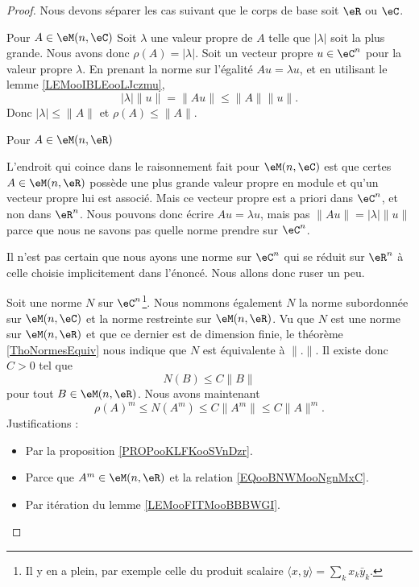 \begin{proof}
    Nous devons séparer les cas suivant que le corps de base soit \( \eR\) ou \( \eC\).

    \begin{subproof}
        \item[Pour \( A\in \eM(n,\eC)\)]
            Soit \( \lambda\) une valeur propre de \( A\) telle que \( | \lambda |\) soit la plus grande. Nous avons donc \( \rho(A)=| \lambda |\). Soit un vecteur propre \( u\in \eC^n\) pour la valeur propre \( \lambda\). En prenant la norme sur l'égalité \( Au=\lambda u\), et en utilisant le lemme \ref{LEMooIBLEooLJczmu},
            \begin{equation}
                | \lambda |\| u \|=\| Au \|\leq \| A \|\| u \|.
            \end{equation}
            Donc \( | \lambda |\leq \| A \|\) et \( \rho(A)\leq\| A \|\).

        \item[Pour \( A\in \eM(n,\eR)\)]

            L'endroit qui coince dans le raisonnement fait pour \( \eM(n,\eC)\) est que certes \( A\in \eM(n,\eR)\) possède une plus grande valeur propre en module et qu'un vecteur propre lui est associé. Mais ce vecteur propre est a priori dans \( \eC^n\), et non dans \( \eR^n\). Nous pouvons donc écrire \( Au=\lambda u\), mais pas \( \| Au \|=| \lambda |\| u \|\) parce que nous ne savons pas quelle norme prendre sur \( \eC^n\).

            Il n'est pas certain que nous ayons une norme sur \( \eC^n\) qui se réduit sur \( \eR^n\) à celle choisie implicitement dans l'énoncé. Nous allons donc ruser un peu.

            Soit une norme \( N\) sur \( \eC^n\)\footnote{Il y en a plein, par exemple celle du produit scalaire \( \langle x, y\rangle =\sum_kx_k\bar y_k\).}. Nous nommons également \( N\) la norme subordonnée sur \( \eM(n,\eC)\) et la norme restreinte sur \( \eM(n,\eR)\). Vu que \( N\) est une norme sur \( \eM(n,\eR)\) et que ce dernier est de dimension finie, le théorème \ref{ThoNormesEquiv} nous indique que \( N\) est équivalente à \( \| . \|\). Il existe donc \( C>0\) tel que
            \begin{equation}        \label{EQooBNWMooNgnMxC}
                 N(B)\leq C\| B \|
            \end{equation}
            pour tout \( B\in \eM(n,\eR)\). Nous avons maintenant
            \begin{equation}
                \rho(A)^m\leq N(A^m)\leq C\| A^m \|\leq C\| A \|^m.
            \end{equation}
            Justifications :
            \begin{itemize}
                \item Par la proposition \ref{PROPooKLFKooSVnDzr}.
                \item Parce que \( A^m\in \eM(n,\eR)\) et la relation \eqref{EQooBNWMooNgnMxC}.
                \item Par itération du lemme \ref{LEMooFITMooBBBWGI}.
            \end{itemize}
            

\end{subproof}
\end{proof}
